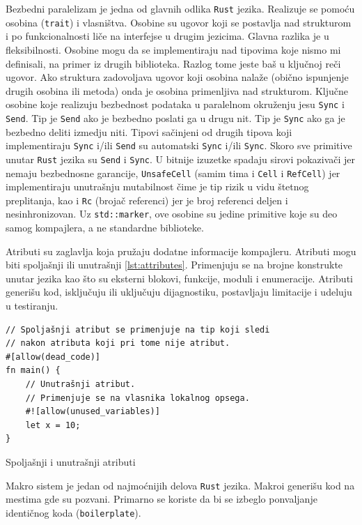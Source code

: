 \documentclass[11pt]{article}
\begin{document}
Bezbedni paralelizam je jedna od glavnih odlika \verb|Rust| jezika. Realizuje se pomoću osobina (\verb|trait|)
i vlasništva. Osobine su ugovor koji se postavlja nad strukturom i po funkcionalnosti liče na interfejse
u drugim jezicima. Glavna razlika je u fleksibilnosti. Osobine mogu da se implementiraju nad tipovima
koje nismo mi definisali, na primer iz drugih biblioteka. Razlog tome jeste baš u ključnoj reči ugovor.
Ako struktura zadovoljava ugovor koji osobina nalaže (obično ispunjenje drugih osobina ili
metoda) onda je osobina primenljiva nad strukturom. Ključne osobine koje realizuju bezbednost podataka
u paralelnom okruženju jesu \verb|Sync| i \verb|Send|. Tip je \verb|Send| ako je bezbedno poslati ga 
u drugu nit. Tip je \verb|Sync| ako ga je bezbedno deliti izmedju niti. Tipovi sačinjeni od drugih tipova koji
implementiraju \verb|Sync| i/ili \verb|Send| su automatski \verb|Sync| i/ili \verb|Sync|. Skoro sve primitive
unutar \verb|Rust| jezika su \verb|Send| i \verb|Sync|. U bitnije izuzetke spadaju sirovi pokazivači jer nemaju
bezbednosne garancije, \verb|UnsafeCell| (samim tima i \verb|Cell| i \verb|RefCell|) jer implementiraju
unutrašnju mutabilnost čime je tip rizik u vidu štetnog preplitanja, kao i \verb|Rc| (brojač referenci) 
jer je broj referenci deljen i nesinhronizovan. Uz \verb|std::marker|, ove osobine su jedine primitive koje su 
deo samog kompajlera, a ne standardne biblioteke.

Atributi su zaglavlja koja pružaju dodatne informacije kompajleru. Atributi mogu biti spoljašnji ili 
unutrašnji \ref{lst:attributes}. Primenjuju se na brojne konstrukte unutar jezika kao što su eksterni blokovi,
funkcije, moduli i enumeracije. Atributi generišu kod, isključuju ili uključuju dijagnostiku, 
postavljaju limitacije i udeluju u testiranju. 

\begin{listing}[H]
\begin{verbatim}
// Spoljašnji atribut se primenjuje na tip koji sledi 
// nakon atributa koji pri tome nije atribut.
#[allow(dead_code)] 
fn main() {
    // Unutrašnji atribut.
    // Primenjuje se na vlasnika lokalnog opsega. 
    #![allow(unused_variables)]
    let x = 10;  
}
\end{verbatim}
\caption{Spoljašnji i unutrašnji atributi}
\label{lst:attributes}
\end{listing}

Makro sistem je jedan od najmoćnijih delova \verb|Rust| jezika. Makroi generišu kod na mestima gde su pozvani.
Primarno se koriste da bi se izbeglo ponvaljanje identičnog koda (\verb|boilerplate|).
\end{document}
